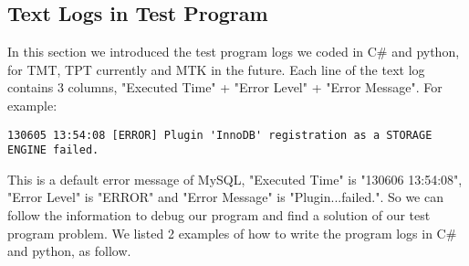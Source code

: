 \documentclass{article}
\begin{document}
\subsection{Text Logs in Test Program}
In this section we introduced the test program logs we coded in C\# and python, for TMT, TPT currently and MTK in the future.
Each line of the text log contains 3 columns, "Executed Time" + "Error Level" + "Error Message".
For example: 
\begin{lstlisting}
130605 13:54:08 [ERROR] Plugin 'InnoDB' registration as a STORAGE ENGINE failed. 
\end{lstlisting}
This is a default error message of MySQL, "Executed Time" is "130606 13:54:08", "Error Level" is "ERROR" and "Error Message" is "Plugin...failed.".
So we can follow the information to debug our program and find a solution of our test program problem.
We listed 2 examples of how to write the program logs in C\# and python, as follow.
\end{document}
